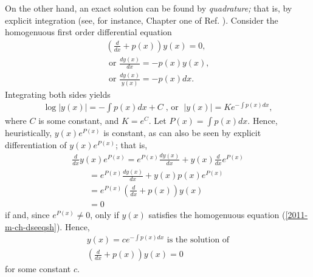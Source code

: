 On the other hand, an exact solution can be found by {\em quadrature;}
that is, by explicit integration (see, for instance, Chapter one of Ref. \cite{birkhoff-Rota-48}).
Consider the homogenuous first order differential equation
\begin{equation}
\begin{split}
\left(\frac{d}{dx} + p(x)  \right)  y(x)=0,\\
\textrm{ or }
\frac{dy(x)}{dx} = - p(x)   y(x) ,
\\ \textrm{ or }
\frac{dy(x)}{ y(x) } = - p(x) dx .
\end{split}
\label{2011-m-ch-dseeqsh}
\end{equation}
Integrating both sides yields
\begin{equation}
\begin{split}
\log \vert y(x)\vert =  - \int p(x) dx +C \; \textrm{, or } \;
\vert y(x)\vert =K e^{- \int p(x) dx},
\end{split}
\label{2011-m-ch-dseedi}
\end{equation}
where $C$ is some constant, and $K=e^C$.
Let $P(x)={ \int p(x) dx}$. Hence, heuristically,
$y(x)e^{P(x)}$ is constant, as can also be seen by explicit differentiation of $y(x)e^{P(x)}$; that is,
\begin{equation}
\begin{split}
\frac{d}{dx}y(x)e^{P(x)}
=  e^{P(x)}\frac{dy(x)}{dx}   +  y(x)\frac{d}{dx} e^{P(x)}\\
\qquad =
e^{P(x)}\frac{dy(x)}{dx}   +  y(x)  p(x) e^{P(x)}\\
\qquad =
e^{P(x)}\left(\frac{d}{dx}   +   p(x) \right)y(x)\\
\qquad = 0
\end{split}
\label{2011-m-ch-dseeed}
\end{equation}
if and, since $ e^{P(x)}\neq 0$,
only if $y(x)$ satisfies the homogenuous equation  (\ref{2011-m-ch-dseeqsh}).
Hence,
\begin{equation}
\begin{split}
y(x)  =c e^{- \int p(x) dx} \textrm { is the solution of}\\
\left(\frac{d}{dx} + p(x)  \right)  y(x)=0
\end{split}
\label{2011-m-ch-dseesoh}
\end{equation}
for some constant $c$.



